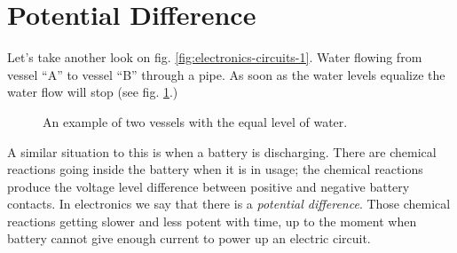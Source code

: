 \documentclass[../sparc.tex]{subfiles}
\begin{document}
\section{Potential Difference}

Let's take another look on fig. \ref{fig:electronics-circuits-1}.  Water flowing
from vessel ``A'' to vessel ``B'' through a pipe.  As soon as the water levels
equalize the water flow will stop (see fig. \ref{fig:electronics-circuits-2}.)

\begin{figure}[ht]
  \centering
  \caption{An example of two vessels with the equal level of water.}
  \label{fig:electronics-circuits-2}
\end{figure}

A similar situation to this is when a battery is discharging.  There are
chemical reactions going inside the battery when it is in usage; the chemical
reactions produce the voltage level difference between positive and negative
battery contacts.  In electronics we say that there is a \emph{potential
difference}.  Those chemical reactions getting slower and less potent with time,
up to the moment when battery cannot give enough current to power up an electric
circuit.
\end{document}
